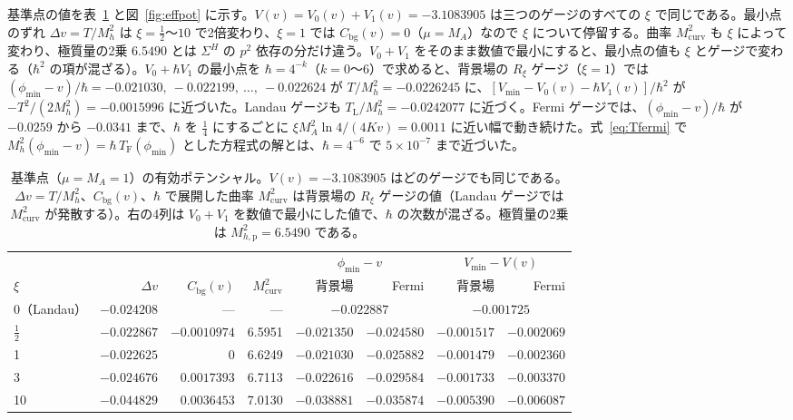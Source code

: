 \documentclass[a4paper,10pt]{ltjsarticle}
\begin{document}
基準点の値を表~\ref{tab:effpot} と図~\ref{fig:effpot} に示す。$V(v)=V_0(v)+V_1(v)=-3.1083905$ は三つのゲージのすべての $\xi$ で同じである。最小点のずれ $\Delta v=T/M_h^2$ は $\xi=\frac12$〜$10$ で2倍変わり、$\xi=1$ では $C_{\mathrm{bg}}(v)=0$（$\mu=M_A$）なので $\xi$ について停留する。曲率 $M_{\mathrm{curv}}^2$ も $\xi$ によって変わり、極質量の2乗 $6.5490$ とは $\Sigma^H$ の $p^2$ 依存の分だけ違う。$V_0+V_1$ をそのまま数値で最小にすると、最小点の値も $\xi$ とゲージで変わる（$\hbar^2$ の項が混ざる）。$V_0+\hbar V_1$ の最小点を $\hbar=4^{-k}$（$k=0$〜$6$）で求めると、背景場の $R_\xi$ ゲージ（$\xi=1$）では $(\phi_{\min}-v)/\hbar=-0.021030,\ -0.022199,\ \ldots,\ -0.022624$ が $T/M_h^2=-0.0226245$ に、$[V_{\min}-V_0(v)-\hbar V_1(v)]/\hbar^2$ が $-T^2/(2M_h^2)=-0.0015996$ に近づいた。Landau ゲージも $T_{\mathrm L}/M_h^2=-0.0242077$ に近づく。Fermi ゲージでは、$(\phi_{\min}-v)/\hbar$ が $-0.0259$ から $-0.0341$ まで、$\hbar$ を $\frac14$ にするごとに $\xi M_A^2\ln4/(4Kv)=0.0011$ に近い幅で動き続けた。式~\eqref{eq:Tfermi} で $M_h^2(\phi_{\min}-v)=\hbar\,T_{\mathrm F}(\phi_{\min})$ とした方程式の解とは、$\hbar=4^{-6}$ で $5\times10^{-7}$ まで近づいた。

\begin{table}[tbp]
\centering\small
\caption{基準点（$\mu=M_A=1$）の有効ポテンシャル。$V(v)=-3.1083905$ はどのゲージでも同じである。$\Delta v=T/M_h^2$、$C_{\mathrm{bg}}(v)$、$\hbar$ で展開した曲率 $M_{\mathrm{curv}}^2$ は背景場の $R_\xi$ ゲージの値（Landau ゲージでは $M_{\mathrm{curv}}^2$ が発散する）。右の4列は $V_0+V_1$ を数値で最小にした値で、$\hbar$ の次数が混ざる。極質量の2乗は $M_{h,\mathrm p}^2=6.5490$ である。}
\label{tab:effpot}
\begin{tabular}{lrrrrrrr}
\toprule
& & & & \multicolumn{2}{c}{$\phi_{\min}-v$} & \multicolumn{2}{c}{$V_{\min}-V(v)$} \\
\cmidrule(lr){5-6}\cmidrule(lr){7-8}
$\xi$ & $\Delta v$ & $C_{\mathrm{bg}}(v)$ & $M_{\mathrm{curv}}^2$ & 背景場 & Fermi & 背景場 & Fermi \\
\midrule
0（Landau） & $-0.024208$ & — & — & \multicolumn{2}{c}{$-0.022887$} & \multicolumn{2}{c}{$-0.001725$} \\
$\frac12$ & $-0.022867$ & $-0.0010974$ & 6.5951 & $-0.021350$ & $-0.024580$ & $-0.001517$ & $-0.002069$ \\
1 & $-0.022625$ & 0 & 6.6249 & $-0.021030$ & $-0.025882$ & $-0.001479$ & $-0.002360$ \\
3 & $-0.024676$ & $0.0017393$ & 6.7113 & $-0.022616$ & $-0.029584$ & $-0.001733$ & $-0.003370$ \\
10 & $-0.044829$ & $0.0036453$ & 7.0130 & $-0.038881$ & $-0.035874$ & $-0.005390$ & $-0.006087$ \\
\bottomrule
\end{tabular}
\end{table}
\end{document}

